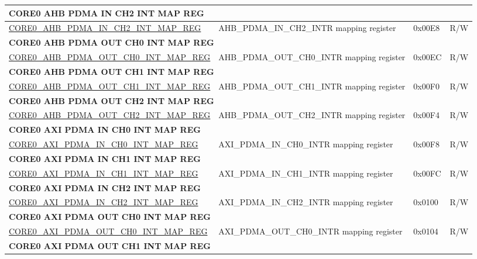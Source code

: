 \begin{longtable}{ | p{7.5cm} | p{7.2cm} | p{1.3cm} | p{1cm} | }
\multicolumn{4}{|l|}{\textbf{CORE0 AHB PDMA IN CH2 INT MAP REG}} \\ \hline
\hyperref[regdesc:CORE0AHBPDMAINCH2INTMAPREG]{CORE0\_AHB\_PDMA\_IN\_CH2\_INT\_MAP\_REG} & AHB\_PDMA\_IN\_CH2\_INTR mapping register & 0x00E8 & R/W \\ \hline
\multicolumn{4}{|l|}{\textbf{CORE0 AHB PDMA OUT CH0 INT MAP REG}} \\ \hline
\hyperref[regdesc:CORE0AHBPDMAOUTCH0INTMAPREG]{CORE0\_AHB\_PDMA\_OUT\_CH0\_INT\_MAP\_REG} & AHB\_PDMA\_OUT\_CH0\_INTR mapping register & 0x00EC & R/W \\ \hline
\multicolumn{4}{|l|}{\textbf{CORE0 AHB PDMA OUT CH1 INT MAP REG}} \\ \hline
\hyperref[regdesc:CORE0AHBPDMAOUTCH1INTMAPREG]{CORE0\_AHB\_PDMA\_OUT\_CH1\_INT\_MAP\_REG} & AHB\_PDMA\_OUT\_CH1\_INTR mapping register & 0x00F0 & R/W \\ \hline
\multicolumn{4}{|l|}{\textbf{CORE0 AHB PDMA OUT CH2 INT MAP REG}} \\ \hline
\hyperref[regdesc:CORE0AHBPDMAOUTCH2INTMAPREG]{CORE0\_AHB\_PDMA\_OUT\_CH2\_INT\_MAP\_REG} & AHB\_PDMA\_OUT\_CH2\_INTR mapping register & 0x00F4 & R/W \\ \hline
\multicolumn{4}{|l|}{\textbf{CORE0 AXI PDMA IN CH0 INT MAP REG}} \\ \hline
\hyperref[regdesc:CORE0AXIPDMAINCH0INTMAPREG]{CORE0\_AXI\_PDMA\_IN\_CH0\_INT\_MAP\_REG} & AXI\_PDMA\_IN\_CH0\_INTR mapping register & 0x00F8 & R/W \\ \hline
\multicolumn{4}{|l|}{\textbf{CORE0 AXI PDMA IN CH1 INT MAP REG}} \\ \hline
\hyperref[regdesc:CORE0AXIPDMAINCH1INTMAPREG]{CORE0\_AXI\_PDMA\_IN\_CH1\_INT\_MAP\_REG} & AXI\_PDMA\_IN\_CH1\_INTR mapping register & 0x00FC & R/W \\ \hline
\multicolumn{4}{|l|}{\textbf{CORE0 AXI PDMA IN CH2 INT MAP REG}} \\ \hline
\hyperref[regdesc:CORE0AXIPDMAINCH2INTMAPREG]{CORE0\_AXI\_PDMA\_IN\_CH2\_INT\_MAP\_REG} & AXI\_PDMA\_IN\_CH2\_INTR mapping register & 0x0100 & R/W \\ \hline
\multicolumn{4}{|l|}{\textbf{CORE0 AXI PDMA OUT CH0 INT MAP REG}} \\ \hline
\hyperref[regdesc:CORE0AXIPDMAOUTCH0INTMAPREG]{CORE0\_AXI\_PDMA\_OUT\_CH0\_INT\_MAP\_REG} & AXI\_PDMA\_OUT\_CH0\_INTR mapping register & 0x0104 & R/W \\ \hline
\multicolumn{4}{|l|}{\textbf{CORE0 AXI PDMA OUT CH1 INT MAP REG}} \\ \hline

\end{longtable}
